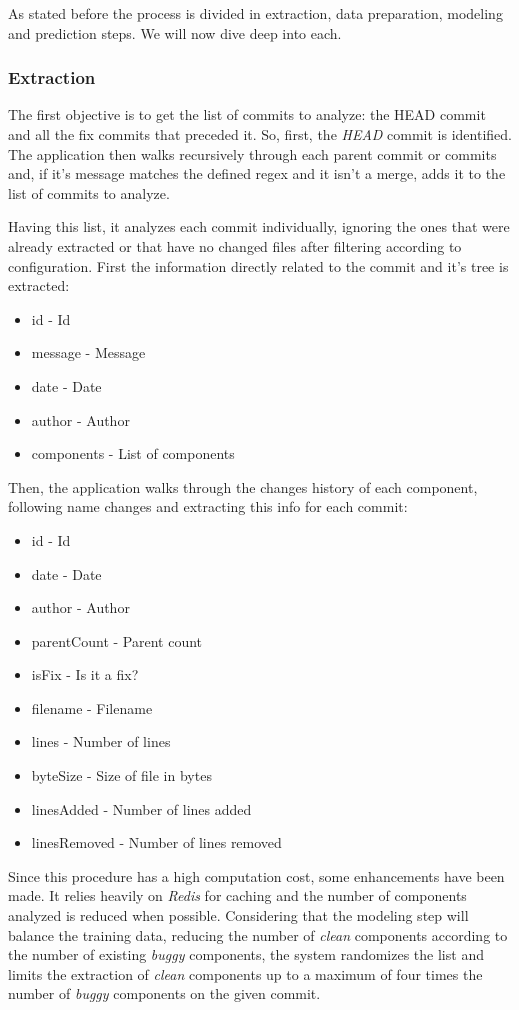 As stated before the process is divided in extraction, data preparation, modeling and prediction steps. We will now dive deep into each.

\subsubsection{Extraction}

The first objective is to get the list of commits to analyze: the HEAD commit and all the fix commits that preceded it. 
So, first, the \emph{HEAD} commit is identified. The application then walks recursively through each parent commit or commits and,
if it's message matches the defined regex and it isn't a merge, adds it to the list of commits to analyze.


Having this list, it analyzes each commit individually, ignoring the ones that were already extracted or that have no changed files after filtering
according to configuration.
First the information directly related to the commit and it's tree is extracted:
%
\begin{itemize}
\item id - Id
\item message - Message
\item date - Date
\item author - Author
\item components - List of components
\end{itemize}

Then, the application walks through the changes history of each component, following name changes and extracting this info for each commit:
%
\begin{itemize}
\item id - Id
\item date - Date
\item author - Author
\item parentCount - Parent count
\item isFix - Is it a fix?
\item filename - Filename
\item lines - Number of lines
\item byteSize - Size of file in bytes
\item linesAdded - Number of lines added
\item linesRemoved - Number of lines removed
\end{itemize}

Since this procedure has a high computation cost, some enhancements have been made. It relies heavily on \emph{Redis} for caching 
and the number of components analyzed is reduced when possible. Considering that the modeling step will balance the training data, 
reducing the number of \emph{clean} components according to the number of existing \emph{buggy} components, the system randomizes the list and
limits the extraction of \emph{clean} components up to a maximum of four times the number of \emph{buggy} components on the given commit.


